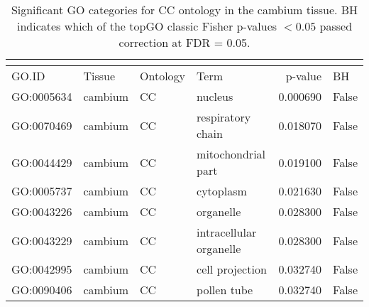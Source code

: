\begin{longtable}{llllrl}
\caption{Significant GO categories for CC ontology in the cambium tissue. BH indicates which of the topGO classic Fisher p-values $< 0.05$ passed correction at FDR = 0.05.}\\
\label{tab:go-cambium-CC}\\
\toprule
GO.ID & Tissue & Ontology & Term & p-value & BH \\
\midrule
GO:0005634 & cambium & CC &   nucleus  & 0.000690 &   False \\
GO:0070469 & cambium & CC &   respiratory chain  & 0.018070 &   False \\
GO:0044429 & cambium & CC &   mitochondrial part  & 0.019100 &   False \\
GO:0005737 & cambium & CC &   cytoplasm  & 0.021630 &   False \\
GO:0043226 & cambium & CC &   organelle  & 0.028300 &   False \\
GO:0043229 & cambium & CC &   intracellular organelle  & 0.028300 &   False \\
GO:0042995 & cambium & CC &   cell projection  & 0.032740 &   False \\
GO:0090406 & cambium & CC &   pollen tube  & 0.032740 &   False \\
\bottomrule
\end{longtable}
